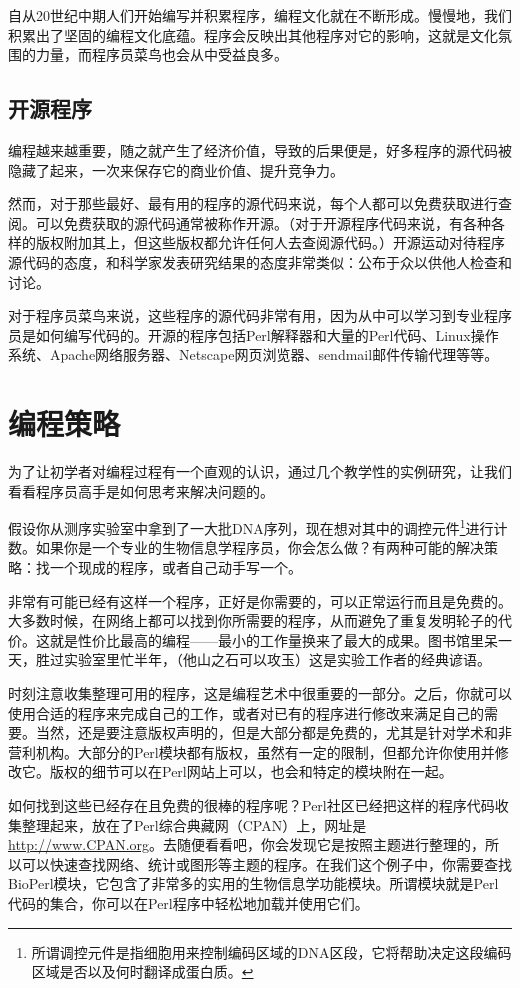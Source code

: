 自从20世纪中期人们开始编写并积累程序，编程文化就在不断形成。慢慢地，我们积累出了坚固的编程文化底蕴。程序会反映出其他程序对它的影响，这就是文化氛围的力量，而程序员菜鸟也会从中受益良多。

\subsection{开源程序}
编程越来越重要，随之就产生了经济价值，导致的后果便是，好多程序的源代码被隐藏了起来，一次来保存它的商业价值、提升竞争力。

然而，对于那些最好、最有用的程序的源代码来说，每个人都可以免费获取进行查阅。可以免费获取的源代码通常被称作开源。（对于开源程序代码来说，有各种各样的版权附加其上，但这些版权都允许任何人去查阅源代码。）开源运动对待程序源代码的态度，和科学家发表研究结果的态度非常类似：公布于众以供他人检查和讨论。

对于程序员菜鸟来说，这些程序的源代码非常有用，因为从中可以学习到专业程序员是如何编写代码的。开源的程序包括Perl解释器和大量的Perl代码、Linux操作系统、Apache网络服务器、Netscape网页浏览器、sendmail邮件传输代理等等。

\section{编程策略}
为了让初学者对编程过程有一个直观的认识，通过几个教学性的实例研究，让我们看看程序员高手是如何思考来解决问题的。

假设你从测序实验室中拿到了一大批DNA序列，现在想对其中的调控元件\footnote{所谓调控元件是指细胞用来控制编码区域的DNA区段，它将帮助决定这段编码区域是否以及何时翻译成蛋白质。}进行计数。如果你是一个专业的生物信息学程序员，你会怎么做？有两种可能的解决策略：找一个现成的程序，或者自己动手写一个。

非常有可能已经有这样一个程序，正好是你需要的，可以正常运行而且是免费的。大多数时候，在网络上都可以找到你所需要的程序，从而避免了重复发明轮子的代价。这就是性价比最高的编程——最小的工作量换来了最大的成果。图书馆里呆一天，胜过实验室里忙半年，（他山之石可以攻玉）这是实验工作者的经典谚语。

时刻注意收集整理可用的程序，这是编程艺术中很重要的一部分。之后，你就可以使用合适的程序来完成自己的工作，或者对已有的程序进行修改来满足自己的需要。当然，还是要注意版权声明的，但是大部分都是免费的，尤其是针对学术和非营利机构。大部分的Perl模块都有版权，虽然有一定的限制，但都允许你使用并修改它。版权的细节可以在Perl网站上可以，也会和特定的模块附在一起。

如何找到这些已经存在且免费的很棒的程序呢？Perl社区已经把这样的程序代码收集整理起来，放在了Perl综合典藏网（CPAN）上，网址是 \href{http://www.CPAN.org}{http://www.CPAN.org}。去随便看看吧，你会发现它是按照主题进行整理的，所以可以快速查找网络、统计或图形等主题的程序。在我们这个例子中，你需要查找BioPerl模块，它包含了非常多的实用的生物信息学功能模块。所谓模块就是Perl代码的集合，你可以在Perl程序中轻松地加载并使用它们。

